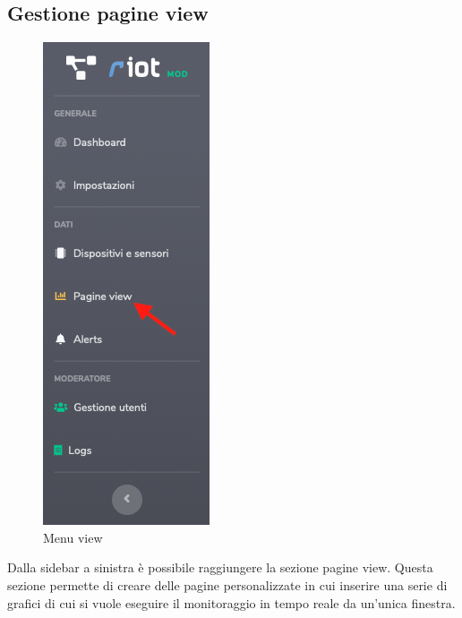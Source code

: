 \subsection{Gestione pagine view}
	
	\begin{figure}[H]
		\centering
		\includegraphics[scale=0.600]{res/images/membro/menuView.png}
		\caption{Menu view}
	\end{figure}
	Dalla sidebar a sinistra è possibile raggiungere la sezione pagine view.
	Questa sezione permette di creare delle pagine personalizzate in cui inserire una serie di grafici di cui si vuole eseguire il monitoraggio in tempo reale da un'unica finestra.
